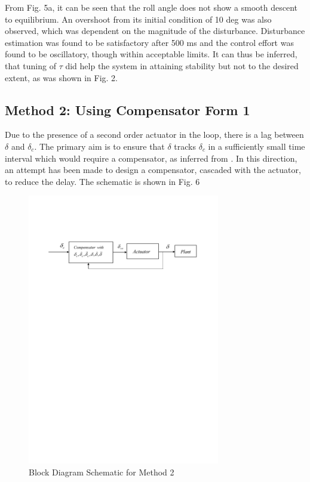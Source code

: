 \documentclass[conference]{IEEEtran}
\begin{document}
From Fig. 5a, it can be seen that the roll angle does not show a smooth descent to equilibrium. An overshoot from its initial condition of 10 deg was also observed, which was dependent on the magnitude of the disturbance. Disturbance estimation was found to be satisfactory after 500 ms and the control effort was found to be oscillatory, though within acceptable limits.
It can thus be inferred, that tuning of $\tau$ did help the system in attaining stability but not to the desired extent, as was shown in Fig. 2.
  
\subsection{Method 2: Using Compensator Form 1}
Due to the presence of a second order actuator in the loop, there is a lag between $\delta$ and $\delta_c$. The primary aim is to ensure that $\delta$ tracks $\delta_c$ in a sufficiently small time interval which would require a compensator, as inferred from \cite{chwa2004}. In this direction, an attempt has been made to design a compensator, cascaded with the actuator, to reduce the delay. The schematic is shown in Fig. 6
\begin{figure}[h]
\begin{center}
\includegraphics[width=8.4cm]{fig7}    %
\caption{Block Diagram Schematic for Method 2} 
\label{fig6}
\end{center}
\end{figure}
\end{document}
